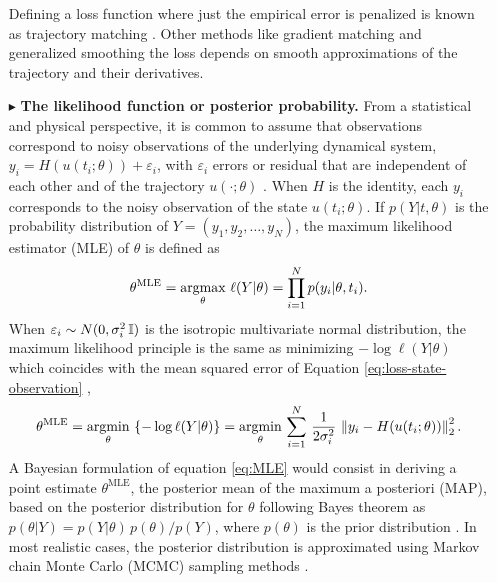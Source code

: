 \begin{itemize}
    Defining a loss function where just the empirical error is penalized is known as trajectory matching \cite{ramsay2017dynamic}. 
    Other methods like gradient matching and generalized smoothing the loss depends on smooth approximations of the trajectory and their derivatives. 
    \item[$ \blacktriangleright$] \textbf{The likelihood function or posterior probability.} From a statistical and physical perspective, it is common to assume that observations correspond to noisy observations of the underlying dynamical system, $y_i = H(u(t_i; \theta)) + \varepsilon_i$, with $\varepsilon_i$ errors or residual that are independent of each other and of the trajectory $u(\cdot ; \theta)$ \cite{ramsay2017dynamic}.
    When $H$ is the identity, each $y_i$ corresponds to the noisy observation of the state $u(t_i; \theta)$.
    If $p(Y | t , \theta)$ is the probability distribution of $Y=(y_1, y_2, \ldots, y_N)$, 
    the maximum likelihood estimator (MLE) of $\theta$ is defined as 
    \begin{equation}
        \theta^\text{MLE} 
        = 
        \underset{\theta}{\text{argmax}} \,\, \ell (Y | \theta) 
        = 
        \prod_{i=1}^N p(y_i | \theta, t_i) .
    \end{equation}
    When $\varepsilon_i \sim N(0, \sigma_i^2 \operatorname{\mathbb{I}})$ is the isotropic multivariate normal distribution, the maximum likelihood principle is the same as minimizing $- \log \ell(Y | \theta)$ which coincides with the mean squared error of Equation \eqref{eq:loss-state-observation} \cite{hastie2009elements},
    \begin{equation}
        \theta^\text{MLE} 
        = 
        \underset{\theta}{\text{argmin}} \, \left \{ - \log \ell (Y | \theta) \right \}
        = 
        \underset{\theta}{\text{argmin}} \, \sum_{i=1}^N 
        \, \frac{1}{2\sigma_i^2} \,
        \left \| y_i - H(u(t_i; \theta)) \right \|_2^2 .
        \label{eq:MLE}
    \end{equation}
    A Bayesian formulation of equation \eqref{eq:MLE} would consist in deriving a point estimate $\theta^\text{MLE}$, the posterior mean of the maximum a posteriori (MAP), based on the posterior distribution for $\theta$ following Bayes theorem as $p(\theta | Y) = {p(Y | \theta) \, p (\theta)}/{p(Y)}$, where $p(\theta)$ is the prior distribution \cite{pml1Book}.
    In most realistic cases, the posterior distribution is approximated using Markov chain Monte Carlo (MCMC) sampling methods \cite{gelman2013bayesian}. 

\end{itemize}
